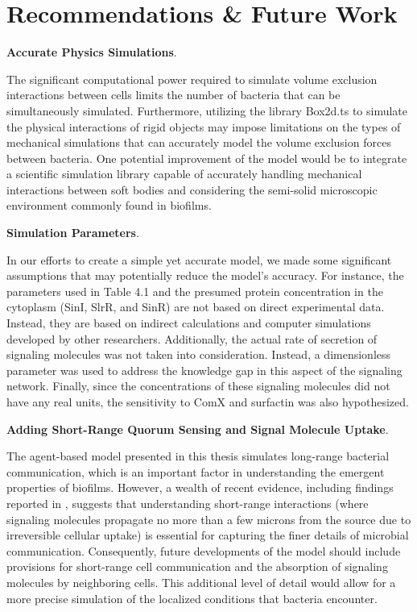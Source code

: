 \section{Recommendations \& Future Work}\label{sec:future_Ch7}

\textbf{Accurate Physics Simulations}.

The significant computational power required to simulate volume exclusion interactions between cells limits the number of bacteria that can be simultaneously simulated. Furthermore, utilizing the library Box2d.ts to simulate the physical interactions of rigid objects may impose limitations on the types of mechanical simulations that can accurately model the volume exclusion forces between bacteria. One potential improvement of the model would be to integrate a scientific simulation library capable of accurately handling mechanical interactions between soft bodies and considering the semi-solid microscopic environment commonly found in biofilms.


\textbf{Simulation Parameters}.

In our efforts to create a simple yet accurate model, we made some significant assumptions that may potentially reduce the model's accuracy. For instance, the parameters used in Table 4.1 and the presumed protein concentration in the cytoplasm (SinI, SlrR, and SinR) are not based on direct experimental data. Instead, they are based on indirect calculations and computer simulations developed by other researchers. Additionally, the actual rate of secretion of signaling molecules was not taken into consideration. Instead, a dimensionless parameter was used to address the knowledge gap in this aspect of the signaling network. Finally, since the concentrations of these signaling molecules did not have any real units, the sensitivity to ComX and surfactin was also hypothesized.


\textbf{Adding Short-Range Quorum Sensing and Signal Molecule Uptake}.

The agent-based model presented in this thesis simulates long-range bacterial communication, which is an important factor in understanding the emergent properties of biofilms. However, a wealth of recent evidence, including findings reported in {\footnotesize\cite{vanGestel2021}}, suggests that understanding short-range interactions (where signaling molecules propagate no more than a few microns from the source due to irreversible cellular uptake) is essential for capturing the finer details of microbial communication. Consequently, future developments of the model should include provisions for short-range cell communication and the absorption of signaling molecules by neighboring cells. This additional level of detail would allow for a more precise simulation of the localized conditions that bacteria encounter.


